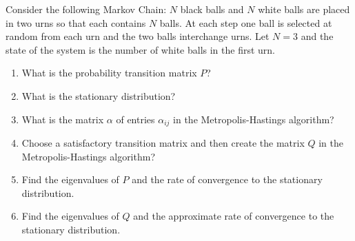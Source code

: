 \documentclass[12pt]{article}
\begin{document}
\begin{exercise}
    Consider the following Markov Chain:  \( N \) black balls and \( N \)
    white balls are placed in two urns so that each contains \( N \)
    balls.  At each step one ball is selected at random from each urn
    and the two balls interchange urns.  Let \( N = 3 \) and the state
    of the system is the number of white balls in the first urn.
    \begin{enumerate}[label=(\alph*)]
    \item
        What is the probability transition matrix \( P \)?
    \item
        What is the stationary distribution?
    \item
        What is the matrix \( \alpha \) of entries \( \alpha_{ij} \) in
        the Metropolis-Hastings algorithm?
    \item
        Choose a satisfactory transition matrix and then create the
        matrix \( Q \) in the Metropolis-Hastings algorithm?
    \item
        Find the eigenvalues of \( P \) and the rate of convergence to
        the stationary distribution.
    \item
        Find the eigenvalues of \( Q \) and the approximate rate of
        convergence to the stationary distribution.
\end{enumerate}
\end{exercise}
\end{document}
